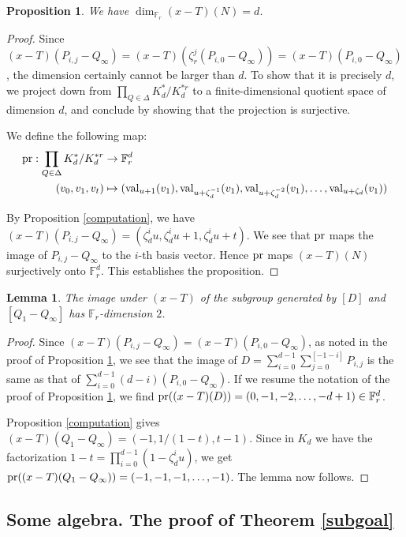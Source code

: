 \documentclass[reqno]{amsart}
\newtheorem{lemma}[thm]{Lemma}
\newtheorem{proposition}[thm]{Proposition}
\theoremstyle{definition}
\theoremstyle{remark}
\newcommand{\XminusT}{(x-T)}
\newcommand{\val}{\operatorname{val}}
\newcommand{\pr}{\operatorname{pr}}
\def\F{\mathbb{F}}
\def\pr{\textnormal{pr}}
\begin{document}
\begin{proposition}
\label{dimensiond}
We have $\dim_{\F_r} \XminusT(N) = d$.
\end{proposition}
\begin{proof}
Since $\XminusT(P_{i,j}-Q_\infty) = \XminusT(\zeta_r^j (P_{i,0}-Q_\infty)) = \XminusT(P_{i,0} - Q_\infty)$, the dimension certainly cannot be larger than $d$. To show that it is precisely $d$, we project down from $\prod_{Q \in \Delta} K_d^{\ast} / K_d^{\ast r}$ to a finite-dimensional quotient space of dimension $d$, and conclude by showing that the projection is surjective.

We define the following map:
\begin{align*}
\pr : \prod_{Q \in \Delta} K_d^{\ast} / K_d^{\ast r} & \rightarrow \F_r^{d} \\\
(v_0,v_1,v_t)                                    & \mapsto (\val_{u+1}(v_1),\val_{u+\zeta_d^{-1}}(v_1),\val_{u+\zeta_d^{-2}}(v_1),\ldots,\val_{u+\zeta_d}(v_1))
\end{align*}

By Proposition \ref{computation}, we have $\XminusT(P_{i,j}-Q_\infty) = (\zeta_d^i u,\zeta_d^i u + 1,\zeta_d^i u + t)$. We see that $\pr$ maps the image of $P_{i,j} - Q_\infty$ to the $i$-th basis vector. Hence $\pr$ maps $\XminusT(N)$ surjectively onto $\F_r^d$. This establishes the proposition.
\end{proof}

\begin{lemma}
\label{dimensiontorsion}
The image under $\XminusT$ of the subgroup generated by $[D]$ and $[Q_1-Q_\infty]$ has $\F_r$-dimension $2$.
\end{lemma}
\begin{proof}
Since $\XminusT(P_{i,j}-Q_\infty) = \XminusT(P_{i,0} - Q_\infty)$, as noted in the proof of Proposition \ref{dimensiond}, we see that the image of $D=\sum_{i=0}^{d-1} \sum_{j=0}^{[-1-i]} P_{i,j}$ is the same as that of $\sum_{i=0}^{d-1} (d-i) (P_{i,0} - Q_\infty)$. If we resume the notation of the proof of Proposition \ref{dimensiond}, we find $\pr(\XminusT(D)) = (0,-1,-2,\ldots,-d+1) \in \F_r^d$.

Proposition \ref{computation} gives $\XminusT(Q_1-Q_\infty)=(-1,1/(1-t),t-1)$. Since in $K_d$ we have the factorization $1-t = \prod_{i=0}^{d-1} (1-\zeta_d^i u)$, we get $\pr(\XminusT(Q_1-Q_\infty)) = (-1,-1,-1,\ldots,-1)$. The lemma now follows.
\end{proof}

\subsection{Some algebra. The proof of Theorem \ref{subgoal}}
\end{document}
